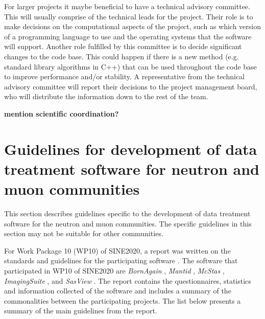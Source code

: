 \documentclass[jnr]{iosart2x}
\newcommand{\todo}[1]{\textbf{#1}}
\begin{document}
For larger projects it maybe beneficial to have a technical advisory committee.
This will usually comprise of the technical leads for the project.
Their role is to make decisions on the computational aspects of the project, such as which version of a programming language to use and the operating systems that the software will support.
Another role fulfilled by this committee is to decide significant changes to the code base.
This could happen if there is a new method (e.g. standard library algorithms in C++) that can be used throughout the code base to improve performance and/or stability.
A representative from the technical advisory committee will report their decisions to the project management board, who will distribute the information down to the rest of the team.

\todo{mention scientific coordination?}

\section{Guidelines for development of data treatment software for neutron and muon communities}
\label{SINE2020}

This section describes guidelines specific to the development of data treatment software for the neutron and muon communities.
The specific guidelines in this section may not be suitable for other communities.

For Work Package 10 (WP10) of SINE2020, a report was written on the standards and guidelines for the participating software \cite{sine2020_wp10_d10_report}.
The software that participated in WP10 of SINE2020 are {\it BornAgain} \cite{bornagain}, {\it Mantid} \cite{mantid}, {\it McStas} \cite{mcstats}, {\it ImagingSuite} \cite{ImagingSuite}, and {\it SasView} \cite{sasview}.
The report contains the questionnaires, statistics and information collected of the software and includes a summary of the commonalities between the participating projects.
The list below presents a summary of the main guidelines from the report.
\end{document}
